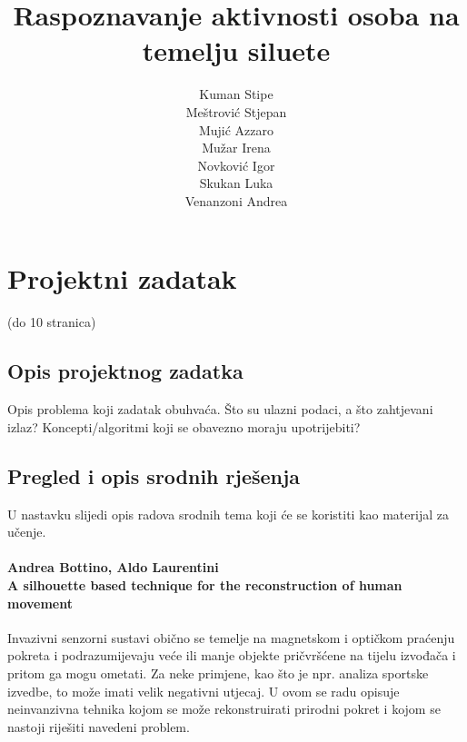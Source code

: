 \documentclass[times, utf8, diplomski]{fer}
\begin{document}
\title{ Raspoznavanje aktivnosti osoba na temelju siluete }


\author{ \begin{tabular}{ l }
	Kuman Stipe \\
	Meštrović Stjepan \\
	Mujić Azzaro \\
	Mužar Irena \\
	Novković Igor \\
	Skukan Luka \\
	Venanzoni Andrea \\
\end{tabular}  }

\maketitle

\zahvala{}

\tableofcontents


\chapter{Projektni zadatak}

(do 10 stranica)

\section{Opis projektnog zadatka}

Opis problema koji zadatak obuhvaća. Što su ulazni podaci, a što zahtjevani izlaz? Koncepti/algoritmi koji se obavezno moraju upotrijebiti?

\section{Pregled i opis srodnih rješenja}

U nastavku slijedi opis radova srodnih tema koji će se koristiti kao materijal za učenje.


\subsubsection{Andrea Bottino, Aldo Laurentini\\
A silhouette based technique for the reconstruction of human movement }


Invazivni senzorni sustavi obično se temelje na magnetskom i optičkom praćenju pokreta i
podrazumijevaju veće ili manje objekte pričvršćene na tijelu izvođača i pritom ga mogu
ometati. Za neke primjene, kao što je npr. analiza sportske izvedbe, to može imati velik
negativni utjecaj. U ovom se radu opisuje neinvanzivna tehnika kojom se može rekonstruirati
prirodni pokret i kojom se nastoji riješiti navedeni problem.
\end{document}
